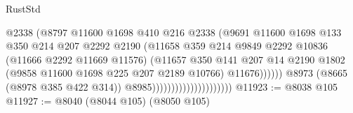 \begin{lexlean}{RustStd}
\begin{coremodule}
                                                  @2338
                                                  (@8797
                                                    @11600
                                                    @1698
                                                    @410
                                                    @216
                                                    @2338
                                                    (@9691
                                                      @11600
                                                      @1698
                                                      @133
                                                      @350
                                                      @214
                                                      @207
                                                      @2292
                                                      @2190
                                                      (@11658
                                                        @359
                                                        @214
                                                        @9849
                                                        @2292
                                                        @10836
                                                        (@11666 @2292 @11669 @11576)
                                                        (@11657
                                                          @350
                                                          @141
                                                          @207
                                                          @14
                                                          @2190
                                                          @1802
                                                          (@9858
                                                            @11600
                                                            @1698
                                                            @225
                                                            @207
                                                            @2189
                                                            @10766)
                                                          @11676))))))
                                              @8973
                                              (@8665 (@8978 @385 @422 @314))
                                              @8985)))))))))))))))))))))
@11923 := @8038 @105
@11927 := @8040 (@8044 @105) (@8050 @105)

\end{coremodule}
\end{lexlean}
